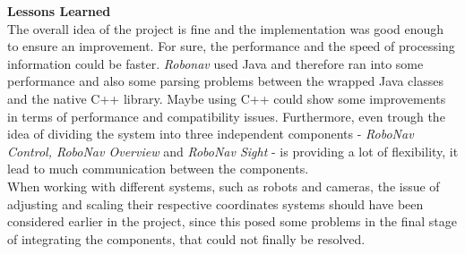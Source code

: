 \textbf{Lessons Learned}\\
The overall idea of the project is fine and the implementation was good enough to ensure an improvement.
For sure, the performance and the speed of processing information could be faster. \textit{Robonav} used Java and therefore ran into some performance and also some parsing problems between the wrapped Java classes and the native C++ library. Maybe using C++ could show some improvements in terms of performance and compatibility issues. Furthermore, even trough the idea of dividing the system into three independent components - \textit{RoboNav Control, RoboNav Overview} and \textit{RoboNav Sight} - is providing a lot of flexibility, it lead to much communication between the components. \\
When working with different systems, such as robots and cameras, the issue of adjusting and scaling their respective coordinates systems should have been considered earlier in the project, since this posed some problems in the final stage of integrating the components, that could not finally be resolved. 
\\\\
